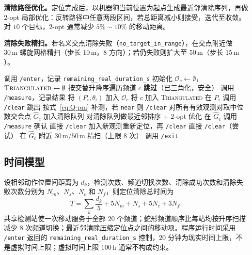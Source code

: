 \documentclass[12pt,a4paper]{ctexart}
\begin{document}
\textbf{清除路径优化。}定位完成后，以机器狗当前位置为起点生成最近邻清除序列，再做 $2$-opt 局部优化：反转路径中任意两段区间，若总距离减小则接受，迭代至收敛。对 $10$ 个目标，$2$-opt 通常减少 $5\%\sim10\%$ 的移动距离。

\textbf{清除失败精扫。}若名义交点清除失败（\texttt{no\_target\_in\_range}），在交点附近做 $30\,\mathrm{m}$ 螺旋网格精扫（步长 $10\,\mathrm{m}$，$8$ 方向）；若仍失败则扩大至 $50\,\mathrm{m}$（步长 $15\,\mathrm{m}$）。

\begin{algorithm}[H]
\caption{问题三自适应扫描与清除算法（v2）}
\begin{algorithmic}[1]
\State 调用 \texttt{/enter}，记录 \texttt{remaining\_real\_duration\_s}
\State 初始化 $\mathcal O_c\leftarrow\emptyset$，$\textsc{Triangulated}\leftarrow\emptyset$
  \State 按交替升降序遍历频道 $c$
   \State \textbf{跳过}（已三角化，安全） \EndIf
  \State 调用 \texttt{/measure}，记录结果
    \State 将 $(P_i,\theta_i)$ 加入 $\mathcal O_c$
      \State 将 $c$ 加入 \textsc{Triangulated}
    \EndIf
   \State 在 $P_i$ 调用 \texttt{/clear}
  \EndIf
   \State 跳出 \EndIf
\EndFor
{}
  \State 按式~\eqref{eq:Q-pm} 补测，若 \texttt{near} 则 \texttt{/clear}
\EndFor
{}
  \State 对所有有效观测对取中位数交会点 $\widehat G_c$
   \State 加入清除队列 \EndIf
\EndFor
\State 对清除队列做最近邻排序 $+$ $2$-opt 优化
  \State 在 $\widehat G_c$ 调用 \texttt{/measure} 确认
   \State 直接 \texttt{/clear}
   \State 加入新观测重新定位，再 \texttt{/clear}
  \Else \State 直接 \texttt{/clear}（尝试）
  \EndIf
   \State 在 $\widehat G_c$ 附近 $30\,\mathrm{m}$/$50\,\mathrm{m}$ 精扫（上限 $8$ 次） \EndIf
\EndFor
\State 调用 \texttt{/exit}
\end{algorithmic}
\end{algorithm}

\subsection{时间模型}
\label{sec:q3-time}
设相邻动作位置间距离为 $d_k$，检测次数、频道切换次数、清除成功次数和清除失败次数分别为 $N_m$、$N_s$、$N_c$ 和 $N_f$，则定位清除总时间为
\begin{equation}
 T=\sum_k\frac{d_k}{5}+5N_m+N_s+5N_c+3N_f.
 \label{eq:time}
\end{equation}
共享检测站使一次移动服务于全部 $20$ 个频道；蛇形频道顺序比每站均按升序扫描减少 $8$ 次频道切换；最近邻清除压缩定位点之间的移动项。程序运行时间采用 \texttt{/enter} 返回的 \texttt{remaining\_real\_duration\_s} 控制，$20$ 分钟为现实时间上限，不是虚拟时间上限；虚拟时间上限 $100\,\mathrm{h}$ 通常不构成约束。
\end{document}
